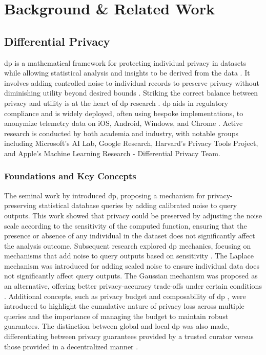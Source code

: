\chapter{Background \& Related Work\label{chap:background}}

\section{Differential Privacy}

\acrfull{dp} is a mathematical framework for protecting individual privacy in datasets while allowing statistical analysis and insights to be derived from the data \cite{Dwork2006calibrating,Dwork2014}. It involves adding controlled noise to individual records to preserve privacy without diminishing utility beyond desired bounds \cite{WhatisDifferentialPrivacy}. Striking the correct balance between privacy and utility is at the heart of \acrshort{dp} research \cite{Dwork2014}. \acrshort{dp} aids in regulatory compliance and is widely deployed, often using bespoke implementations, to anonymize telemetry data on iOS, Android, Windows, and Chrome \cite{Maranon,markdefalco_2020}. Active research is conducted by both academia and industry, with notable groups including Microsoft's AI Lab, Google Research, Harvard's Privacy Tools Project, and Apple's Machine Learning Research - Differential Privacy Team.

\subsection{Foundations and Key Concepts}

The seminal work by \citet{Dwork2006calibrating} introduced \acrshort{dp}, proposing a mechanism for privacy-preserving statistical database queries by adding calibrated noise to query outputs. This work showed that privacy could be preserved by adjusting the noise scale according to the sensitivity of the computed function, ensuring that the presence or absence of any individual in the dataset does not significantly affect the analysis outcome. Subsequent research explored \acrshort{dp} mechanics, focusing on mechanisms that add noise to query outputs based on sensitivity \cite{Dwork2006calibrating}. The Laplace mechanism was introduced for adding scaled noise to ensure individual data does not significantly affect query outputs. The Gaussian mechanism was proposed as an alternative, offering better privacy-accuracy trade-offs under certain conditions \cite{Dwork2014}.
Additional concepts, such as privacy budget \cite{McSherry2007} and composability of \acrshort{dp} \cite{Dwork2014}, were introduced to highlight the cumulative nature of privacy loss across multiple queries and the importance of managing the budget to maintain robust guarantees. The distinction between global and local \acrshort{dp} was also made, differentiating between privacy guarantees provided by a trusted curator versus those provided in a decentralized manner \cite{kasiviswanathan2010learn}.

